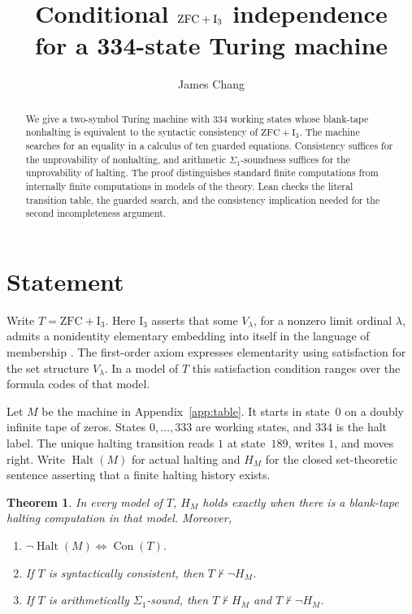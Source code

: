 \documentclass[11pt,letterpaper]{article}
\title{Conditional \texorpdfstring{$\ZFC+\Ithree$}{ZFC + I3} independence\\
for a 334-state Turing machine}
\author{James Chang}
\date{}
\newtheorem{theorem}{Theorem}[section]
\newcommand{\ZFC}{\mathrm{ZFC}}
\newcommand{\Ithree}{\mathrm{I}_3}
\newcommand{\Con}{\operatorname{Con}}
\newcommand{\Halt}{\operatorname{Halt}}
\begin{document}
\maketitle

\begin{abstract}
We give a two-symbol Turing machine with 334 working states whose
blank-tape nonhalting is equivalent to the syntactic consistency of
$\ZFC+\Ithree$. The machine searches for an equality in a calculus of
ten guarded equations. Consistency suffices for the unprovability of
nonhalting, and arithmetic $\Sigma_1$-soundness suffices for the
unprovability of halting. The proof distinguishes standard finite
computations from internally finite computations in models of the
theory. Lean checks the literal transition table, the guarded search,
and the consistency implication needed for the second incompleteness
argument.
\end{abstract}

\section{Statement}

Write $T=\ZFC+\Ithree$. Here $\Ithree$ asserts that some $V_\lambda$,
for a nonzero limit ordinal $\lambda$, admits a nonidentity elementary
embedding into itself in the language of membership
\cite{corazza}. The first-order axiom expresses elementarity using
satisfaction for the set structure $V_\lambda$. In a model of $T$ this
satisfaction condition ranges over the formula codes of that model.

Let $M$ be the machine in Appendix~\ref{app:table}. It starts in
state~$0$ on a doubly infinite tape of zeros. States $0,\ldots,333$ are
working states, and $334$ is the halt label. The unique halting
transition reads $1$ at state~$189$, writes $1$, and moves right.
Write $\Halt(M)$ for actual halting and $H_M$ for the closed
set-theoretic sentence asserting that a finite halting history exists.

\begin{theorem}\label{thm:main}
In every model of $T$, $H_M$ holds exactly when there is a blank-tape
halting computation in that model. Moreover,
\begin{enumerate}
\item $\neg\Halt(M)\iff\Con(T)$.
\item If $T$ is syntactically consistent, then $T\nvdash\neg H_M$.
\item If $T$ is arithmetically $\Sigma_1$-sound, then $T\nvdash H_M$
and $T\nvdash\neg H_M$.
\end{enumerate}
\end{theorem}
\end{document}
